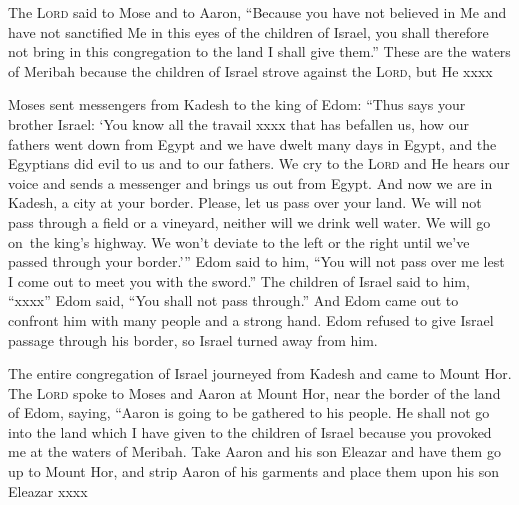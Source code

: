 \begin{inparaenum}
     The \textsc{Lord} said to Mose and to Aaron, ``Because you have not believed in Me and have not sanctified Me in this eyes of the children of Israel, you shall therefore not bring in this congregation to the land I shall give them.''%
     These are the waters of Meribah because the children of Israel strove against the \textsc{Lord}, but He xxxx%
    
     Moses sent messengers from Kadesh to the king of Edom: ``Thus says your brother Israel: `You know all the travail xxxx that has befallen us,%
     how our fathers went down from Egypt and we have dwelt many days in Egypt, and the Egyptians did evil to us and to our fathers.%
     We cry to the \textsc{Lord} and He hears our voice and sends a messenger and brings us out from Egypt. And now we are in Kadesh, a city at your border.%
     Please, let us pass over your land. We will not pass through a field or a vineyard, neither will we drink well water. We will go on\understood\ the king's highway. We won't deviate to the left or the right until we've passed through your border.'\thinspace''%
     Edom said to him, ``You will not pass over me lest I come out to meet you with the sword.''%
     The children of Israel said to him, ``xxxx''%
     Edom said, ``You shall not pass through.'' And Edom came out to confront him with many people and a strong hand.%
     Edom refused to give Israel passage through his border, so Israel turned away from him.%
    
     The entire congregation of Israel journeyed from Kadesh and came to Mount Hor.%
     The \textsc{Lord} spoke to Moses and Aaron at Mount Hor, near the border of the land of Edom, saying,%
     ``Aaron is going to be gathered to his people. He shall not go into the land which I have given to the children of Israel because you provoked me at the waters of Meribah.%
     Take Aaron and his son Eleazar and have them go up to Mount Hor,%
     and strip Aaron of his garments and place them upon his son Eleazar xxxx%
\end{inparaenum}
